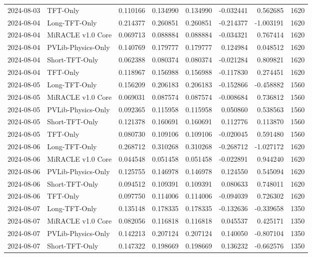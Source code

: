 \begin{tabular}{llrrrrrr}
2024-08-03 & TFT-Only & 0.110166 & 0.134990 & 0.134990 & -0.032441 & 0.562685 & 1620 \\
2024-08-04 & Long-TFT-Only & 0.214377 & 0.260851 & 0.260851 & -0.214377 & -1.003191 & 1620 \\
2024-08-04 & MiRACLE v1.0 Core & 0.069713 & 0.088884 & 0.088884 & -0.034321 & 0.767414 & 1620 \\
2024-08-04 & PVLib-Physics-Only & 0.140769 & 0.179777 & 0.179777 & 0.124984 & 0.048512 & 1620 \\
2024-08-04 & Short-TFT-Only & 0.062388 & 0.080374 & 0.080374 & -0.021284 & 0.809821 & 1620 \\
2024-08-04 & TFT-Only & 0.118967 & 0.156988 & 0.156988 & -0.117830 & 0.274451 & 1620 \\
2024-08-05 & Long-TFT-Only & 0.156209 & 0.206183 & 0.206183 & -0.152866 & -0.458882 & 1560 \\
2024-08-05 & MiRACLE v1.0 Core & 0.069031 & 0.087574 & 0.087574 & -0.008684 & 0.736812 & 1560 \\
2024-08-05 & PVLib-Physics-Only & 0.092365 & 0.115958 & 0.115958 & 0.050860 & 0.538563 & 1560 \\
2024-08-05 & Short-TFT-Only & 0.121378 & 0.160691 & 0.160691 & 0.112776 & 0.113870 & 1560 \\
2024-08-05 & TFT-Only & 0.080730 & 0.109106 & 0.109106 & -0.020045 & 0.591480 & 1560 \\
2024-08-06 & Long-TFT-Only & 0.268712 & 0.310268 & 0.310268 & -0.268712 & -1.027172 & 1620 \\
2024-08-06 & MiRACLE v1.0 Core & 0.044548 & 0.051458 & 0.051458 & -0.022891 & 0.944240 & 1620 \\
2024-08-06 & PVLib-Physics-Only & 0.125755 & 0.146978 & 0.146978 & 0.124550 & 0.545094 & 1620 \\
2024-08-06 & Short-TFT-Only & 0.094512 & 0.109391 & 0.109391 & 0.080633 & 0.748011 & 1620 \\
2024-08-06 & TFT-Only & 0.097750 & 0.114006 & 0.114006 & -0.094039 & 0.726302 & 1620 \\
2024-08-07 & Long-TFT-Only & 0.135148 & 0.178335 & 0.178335 & -0.132636 & -0.339658 & 1350 \\
2024-08-07 & MiRACLE v1.0 Core & 0.082056 & 0.116818 & 0.116818 & 0.045537 & 0.425171 & 1350 \\
2024-08-07 & PVLib-Physics-Only & 0.142213 & 0.207124 & 0.207124 & 0.140050 & -0.807104 & 1350 \\
2024-08-07 & Short-TFT-Only & 0.147322 & 0.198669 & 0.198669 & 0.136232 & -0.662576 & 1350 \\

\end{tabular}
